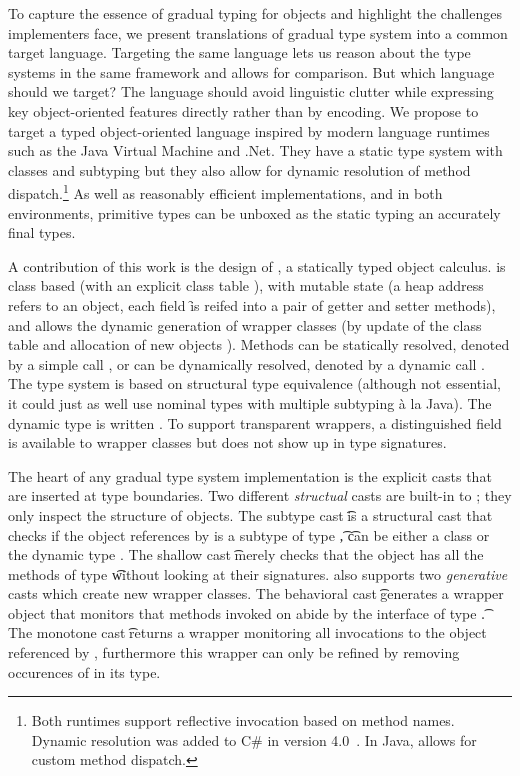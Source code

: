 \documentclass[a4paper,USenglish]{tex/lipics-v2016}
\begin{document}
To capture the essence of gradual typing for objects and highlight the
challenges implementers face, we present translations of gradual type system
into a common target language. Targeting the same language lets us reason
about the type systems in the same framework and allows for comparison. But
which language should we target? The language should avoid linguistic
clutter while expressing key object-oriented features directly rather than
by encoding. We propose to target a typed object-oriented language inspired
by modern language runtimes such as the Java Virtual Machine and .Net.  They
have a static type system with classes and subtyping but they also allow for
dynamic resolution of method dispatch.\footnote{Both runtimes support
reflective invocation based on method names. Dynamic resolution was added
to C\# in version 4.0~\cite{BAT14}. In Java,  allows for
  custom method dispatch.} As well as reasonably efficient implementations,
and in both environments, primitive types can be unboxed as the static
typing an accurately final types.

A contribution of this work is the design of \kafka, a statically typed
object calculus.  \kafka is class based (with an explicit class table \K),
with mutable state (a heap address \a refers to an object, each field \f is
reifed into a pair of getter and setter methods), and allows the dynamic
generation of wrapper classes (by update of the class table \K and
allocation of new objects \a).  Methods can be statically resolved, denoted
by a simple call \Call\a\m\x, or can be dynamically resolved, denoted by a
dynamic call \DynCall\a\m\x. The \kafka type system is based on structural
type equivalence (although not essential, it could just as well use nominal
types with multiple subtyping \`a la Java).  The dynamic type is written
\any. To support transparent wrappers, a distinguished \that field is
available to wrapper classes but does not show up in type
signatures.

The heart of any gradual type system implementation is the explicit casts
that are inserted at type boundaries.  Two different \emph{structual} casts
are built-in to \kafka; they only inspect the structure of objects.  The
subtype cast \SubCast\t\a is a structural cast that checks if the object
references by \a is a subtype of type \t, \t can be either a class \C or the
dynamic type \any.  The shallow cast \ShaCast\t\a merely checks that the
object has all the methods of type \t without looking at their signatures.
\kafka also supports two \emph{generative} casts which create new wrapper
classes.  The behavioral cast \BehCast\t\a generates a wrapper object that
monitors that methods invoked on \a abide by the interface of type \t. The
monotone cast \MonCast\t\a returns a wrapper monitoring all invocations to
the object referenced by \a, furthermore this wrapper can only be refined by
removing occurences of \any in its type.
\end{document}
